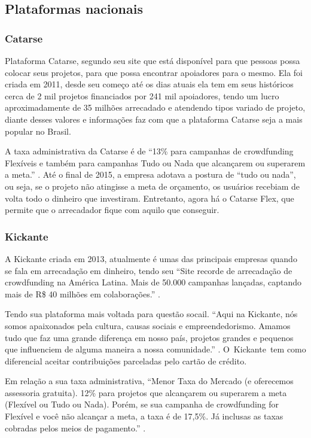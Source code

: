 \documentclass{classe_cn}                 %
\begin{document}
\subsection{Plataformas nacionais}

\subsubsection{Catarse}

Plataforma Catarse, segundo seu site que está disponível para que pessoas possa colocar seus projetos, para que possa encontrar apoiadores para o mesmo. Ela foi criada em 2011, desde seu começo até os dias atuais ela tem em seus históricos cerca de 2 mil projetos financiados por 241 mil apoiadores, tendo um lucro aproximadamente de 35 milhões arrecadado e atendendo tipos variado de projeto, diante desses valores e informações faz com que a plataforma Catarse seja a mais popular no Brasil.

A taxa administrativa da Catarse é de “13\% para campanhas de crowdfunding Flexíveis e também para campanhas Tudo ou Nada que alcançarem ou superarem a meta.” \cite{(BRASIL:2017}. Até o final de 2015, a empresa adotava a postura de “tudo ou nada”, ou seja, se o projeto não atingisse a meta de orçamento, os usuários recebiam de volta todo o dinheiro que investiram. Entretanto, agora há o Catarse Flex, que permite que o arrecadador fique com aquilo que conseguir.

\subsubsection{Kickante}

A Kickante criada em 2013, atualmente é umas das principais empresas quando se fala em arrecadação em dinheiro, tendo seu “Site recorde de arrecadação de crowdfunding na América Latina. Mais de 50.000 campanhas lançadas, captando mais de R\$ 40 milhões em colaborações.” \cite{BRASIL:2017}.

Tendo sua plataforma mais voltada para questão socail. “Aqui na Kickante, nós somos apaixonados pela cultura, causas sociais e empreendedorismo. Amamos tudo que faz uma grande diferença em nosso país, projetos grandes e pequenos que influenciem de alguma maneira a nossa comunidade.” \cite{KICKANTE:2017}. O Kickante tem como diferencial aceitar contribuições parceladas pelo cartão de crédito.

Em relação a sua taxa administrativa, “Menor Taxa do Mercado (e oferecemos assessoria gratuita). 12\% para projetos que alcançarem ou superarem a meta (Flexível ou Tudo ou Nada). Porém, se sua campanha de crowdfunding for Flexível e você não alcançar a meta, a taxa é de 17,5\%. Já inclusas as taxas cobradas pelos meios de pagamento.”  \cite{BRASIL:2017}.
\end{document}
